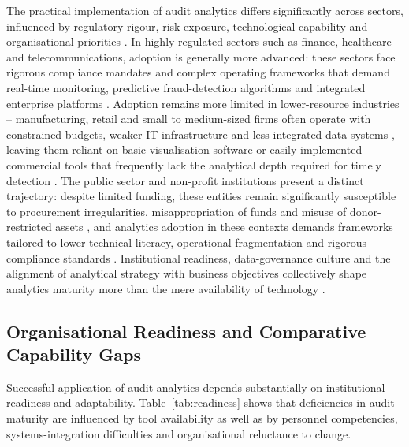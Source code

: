\documentclass[preprint,12pt]{elsarticle}
\begin{document}
The practical implementation of audit analytics differs significantly across sectors, influenced by regulatory rigour, risk exposure, technological capability and organisational priorities \citep{bello2024}. In highly regulated sectors such as finance, healthcare and telecommunications, adoption is generally more advanced: these sectors face rigorous compliance mandates and complex operating frameworks that demand real-time monitoring, predictive fraud-detection algorithms and integrated enterprise platforms \citep{sutisna2025}. Adoption remains more limited in lower-resource industries -- manufacturing, retail and small to medium-sized firms often operate with constrained budgets, weaker IT infrastructure and less integrated data systems \citep{akter2025}, leaving them reliant on basic visualisation software or easily implemented commercial tools that frequently lack the analytical depth required for timely detection \citep{ayodeji2024}. The public sector and non-profit institutions present a distinct trajectory: despite limited funding, these entities remain significantly susceptible to procurement irregularities, misappropriation of funds and misuse of donor-restricted assets \citep{pizzini2025}, and analytics adoption in these contexts demands frameworks tailored to lower technical literacy, operational fragmentation and rigorous compliance standards \citep{alexomiogbemi2024}. Institutional readiness, data-governance culture and the alignment of analytical strategy with business objectives collectively shape analytics maturity more than the mere availability of technology \citep{solano2024}.

\subsection{Organisational Readiness and Comparative Capability Gaps}

Successful application of audit analytics depends substantially on institutional readiness and adaptability. Table~\ref{tab:readiness} shows that deficiencies in audit maturity are influenced by tool availability as well as by personnel competencies, systems-integration difficulties and organisational reluctance to change.
\end{document}
